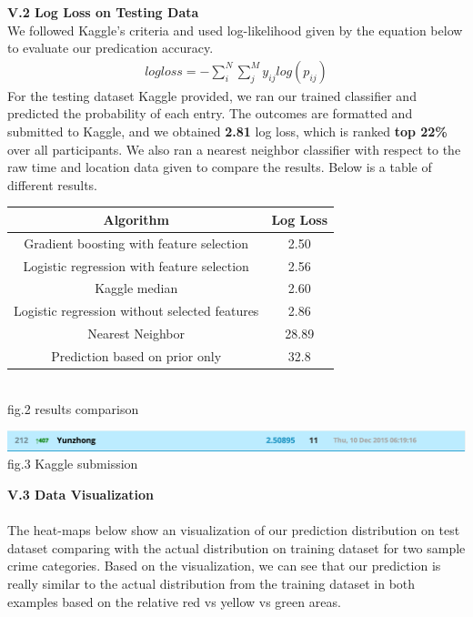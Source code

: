 \documentclass[12pt]{article}
\newenvironment{p4}[2][Part V Results and Evaluation]{\begin{trivlist}
\item[\hskip \labelsep {\bfseries #1}\hskip \labelsep {\bfseries #2}]}{\end{trivlist}}
\begin{document}
\begin{p4}{}
\item{\textbf{V.2 Log Loss on Testing Data}\\}
We followed Kaggle's criteria and used log-likelihood given by the equation below to evaluate our predication accuracy.
\begin{align*}
	logloss = -\sum_i^N \sum_j^M y_{ij} log (p_{ij})
\end{align*}
For the testing dataset Kaggle provided, we ran our trained classifier and predicted the probability of each entry. The outcomes are formatted and submitted to Kaggle, and we obtained \textbf{2.81} log loss, which is ranked \textbf{top 22\%} over all participants. We also ran a nearest neighbor classifier with respect to the raw time and location data given to compare the results. Below is a table of different results.
\begin{center}
	\begin{tabular}{||c c||} 
		\hline
	   	Algorithm & Log Loss \\
		\hline
	   	Gradient boosting with feature selection & 2.50\\
		\hline
		Logistic regression with feature selection & 2.56 \\
		\hline
		Kaggle median & 2.60\\
		\hline
		Logistic regression without selected features& 2.86 \\
		\hline
		Nearest Neighbor & 28.89 \\
		\hline
		Prediction based on prior only & 32.8 \\
		\hline
	\end{tabular}
	{\\fig.2 results comparison}\\
\end{center}
\begin{center}
	\includegraphics[width=16cm]{kaggle_result.png} 
	{\\fig.3 Kaggle submission}\\
\end{center}
\item{\textbf{V.3 Data Visualization}\\}
\\ 
The heat-maps below show an visualization of  our prediction distribution on test dataset comparing with the actual distribution on training dataset for two sample crime categories. Based on the visualization, we can see that our prediction is really similar to the actual distribution from the training dataset in both examples based on the relative red vs yellow vs green areas. \\

\end{p4}
\end{document}
